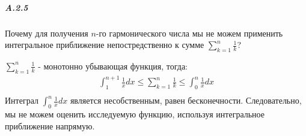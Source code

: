 \subparagraph{A.2.5}
Почему для получения $n$-го гармонического числа мы не можем применить интегральное приближение непостредственно к сумме $\sum_{k=1}^{n} {\frac{1}{k}}$?

$\sum_{k=1}^{n} {\frac{1}{k}}$ - монотонно убывающая функция, тогда:
\begin{gather*}
\int_{1}^{n+1} {\frac{1}{x}dx} \leq \sum_{k=1}^{n} {\frac{1}{k}} \leq \int_{0}^{n} {\frac{1}{x}dx} \\
\end{gather*}
Интеграл $\int_{0}^{n} {\frac{1}{x}dx}$ является несобственным, равен бесконечности.
Следовательно, мы не можем оценить исследуемую функцию, используя интегральное приближение напрямую.